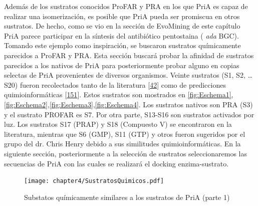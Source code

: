 \documentclass[12pt,twoside]{reedthesis}
\begin{document}
  Además de los sustratos conocidos ProFAR y PRA en los que PriA es capaz
  de realizar una isomerización, es posible que PriA pueda ser promiscua
  en otros sustratos. De hecho, como se vio en la sección de EvoMining de
  este capítulo PriA parece participar en la síntesis del antibiótico
  pentostaina ( \emph{ada} BGC). Tomando este ejemplo como inspiración, se
  buscaron sustratos químicamente parecidos a ProFAR y PRA. Esta sección
  buscará probar la afinidad de sustratos parecidos a los nativos de PriA
  para posteriormente probar alguno en copias selectas de PriA
  provenientes de diversos organismos. Veinte sustratos (S1, S2, \ldots{}
  S20) fueron recolectados tanto de la literatura
  {[}\protect\hyperlink{ref-adams_promiscuous_2014}{42}{]} como de
  predicciones quimioinformáticas
  {[}\protect\hyperlink{ref-jeffryes_mines_2015}{151}{]}. Estos sustratos
  son mostrados en \autoref{fig:Eschema1},
  \autoref{fig:Eschema2},\autoref{fig:Eschema3},\autoref{fig:Eschema4}.
  Los sustratos nativos son PRA (S3) y el sustrato PROFAR es S7. Por otra
  parte, S13-S16 son sustratos activados por luz. Los sustratos S17 (PRAP)
  y S18 (Compuesto V) se encontraron en la literatura, mientras que S6
  (GMP), S11 (GTP) y otros fueron sugeridos por el grupo del dr. Chris
  Henry debido a sus similitudes quimioinformáticas. En la siguiente
  sección, posteriormente a la selección de sustratos seleccionaremos las
  secuencias de PriA con las cuales se realizará el docking
  enzima-sustrato.
  
  \begin{figure}[h!tbp]
  \centering
  \texttt{[image: chapter4/SustratosQuimicos.pdf]}
  \caption[Substatos químicamente similares a los sustratos de PriA (parte 1)]{\footnotesize{Substatos químicamente similares a los sustratos de PriA (parte 1)}}
  \label{fig:Eschema1}
  \end{figure}
  
\end{document}
